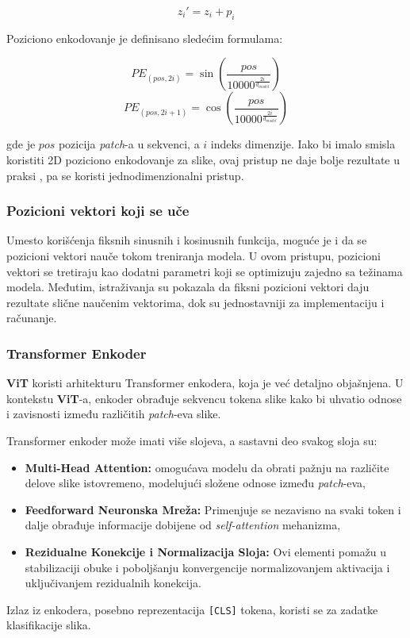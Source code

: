 \documentclass[12pt]{article}
\begin{document}
   \[
   z_i' = z_i + p_i
   \]

   Poziciono enkodovanje je definisano sledećim formulama:

   \[
   PE_{(pos, 2i)} = \sin\left(\frac{pos}{10000^{\frac{2i}{d_{model}}}}\right)
   \]
   \[
   PE_{(pos, 2i+1)} = \cos\left(\frac{pos}{10000^{\frac{2i}{d_{model}}}}\right)
   \]

   gde je \( pos \) pozicija \textit{patch}-a u sekvenci, a \( i \) indeks dimenzije. 
   Iako bi imalo smisla koristiti 2D poziciono enkodovanje za slike, ovaj pristup ne daje bolje
   rezultate u praksi \cite{vit}, pa se koristi jednodimenzionalni pristup.

   \subsubsection*{Pozicioni vektori koji se uče}
   Umesto korišćenja fiksnih sinusnih i kosinusnih funkcija, moguće je i da se 
   pozicioni vektori nauče tokom treniranja modela. U ovom pristupu, 
   pozicioni vektori se tretiraju kao dodatni parametri koji se optimizuju zajedno sa 
   težinama modela. Međutim, istraživanja su pokazala da fiksni pozicioni vektori daju 
   rezultate slične naučenim vektorima, dok su jednostavniji za implementaciju i računanje.


   \subsubsection{Transformer Enkoder}
   \textbf{ViT} koristi arhitekturu Transformer enkodera, koja je već detaljno objašnjena. U 
   kontekstu \textbf{ViT}-a, enkoder obrađuje sekvencu tokena slike kako bi uhvatio odnose 
   i zavisnosti između različitih \textit{patch}-eva slike.

   Transformer enkoder može imati više slojeva, a sastavni deo svakog sloja su:
\begin{itemize}
   \vspace{-0.5cm}
    \item \textbf{Multi-Head Attention:} omogućava modelu da obrati pažnju na različite 
    delove slike istovremeno, modelujući složene odnose između \textit{patch}-eva,
    \item \textbf{Feedforward Neuronska Mreža:} Primenjuje se nezavisno na svaki token i 
    dalje obrađuje informacije dobijene od \textit{self-attention} mehanizma,
    \item \textbf{Rezidualne Konekcije i Normalizacija Sloja:} Ovi elementi pomažu u 
    stabilizaciji obuke i poboljšanju konvergencije normalizovanjem aktivacija i 
    uključivanjem rezidualnih konekcija.
\end{itemize}
   Izlaz iz enkodera, posebno reprezentacija \texttt{[CLS]} tokena, koristi se za zadatke klasifikacije slika. 
\end{document}
